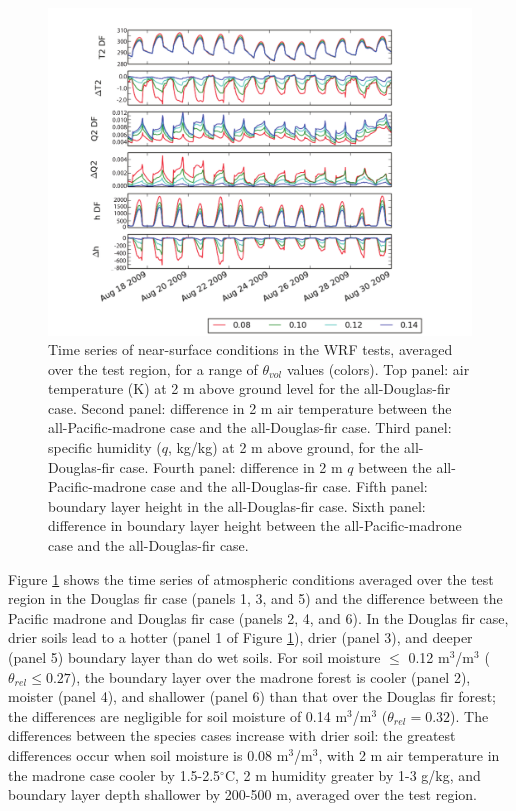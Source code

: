 \begin{figure}[here]
\includegraphics[width=\textwidth]{ch2-BL/figures/T_Q_h_d02.pdf}
\caption{Time series of near-surface conditions in the WRF tests, averaged over the test region, for a range of $\theta_{vol}$ values (colors).  Top panel: air temperature (K) at 2 m above ground level for the all-Douglas-fir case.  Second panel: difference in 2 m air temperature between the all-Pacific-madrone case and the all-Douglas-fir case.  Third panel: specific humidity ($q$, kg/kg) at 2 m above ground, for the all-Douglas-fir case.  Fourth panel: difference in 2 m $q$ between the all-Pacific-madrone case and the all-Douglas-fir case.  Fifth panel: boundary layer height in the all-Douglas-fir case.  Sixth panel: difference in boundary layer height between the all-Pacific-madrone case and the all-Douglas-fir case.}
\label{fig:BL_WRFtseries}
\end{figure}

Figure \ref{fig:BL_WRFtseries} shows the time series of atmospheric conditions averaged over the test region in the Douglas fir case (panels 1, 3, and 5) and the difference between the Pacific madrone and Douglas fir case (panels 2, 4, and 6).  In the Douglas fir case, drier soils lead to a hotter (panel 1 of Figure \ref{fig:BL_WRFtseries}), drier (panel 3), and deeper (panel 5) boundary layer than do wet soils.  For soil moisture $\le$ 0.12 m$^3$/m$^3$ ($\theta_{rel} \le 0.27$), the boundary layer over the madrone forest is cooler (panel 2), moister (panel 4), and shallower (panel 6) than that over the Douglas fir forest; the differences are negligible for soil moisture of 0.14 m$^3$/m$^3$ ($\theta_{rel} = 0.32$).  The differences between the species cases increase with drier soil: the greatest differences occur when soil moisture is 0.08 m$^3$/m$^3$, with 2 m air temperature in the madrone case cooler by 1.5-2.5$^\circ$C, 2 m humidity greater by 1-3 g/kg, and boundary layer depth shallower by 200-500 m, averaged over the test region.

